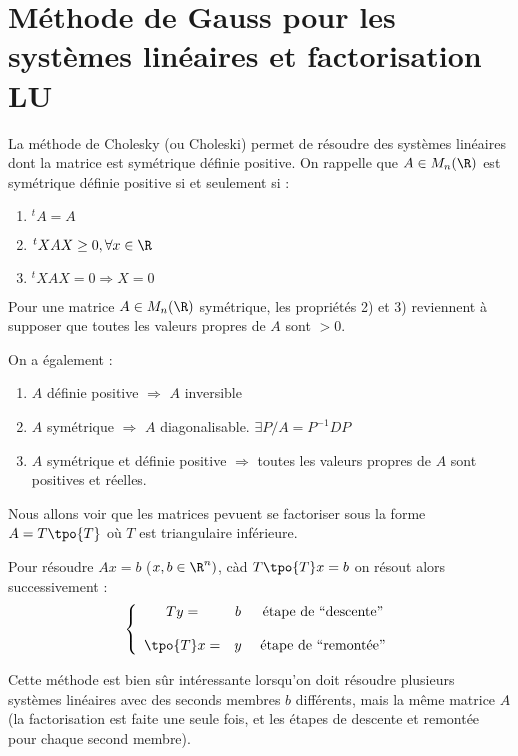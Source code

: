 \chapter{Méthode de Gauss pour les systèmes linéaires et factorisation LU}

La méthode de Cholesky (ou Choleski) permet de résoudre des systèmes linéaires
dont la matrice est symétrique définie positive. On rappelle que
$A \in M_n(\R)$ est symétrique définie positive si et seulement si :
\begin{enumerate}
    \item $^tA = A$
    \item $^tXAX \geq 0, \forall x \in \R$
    \item $^tXAX = 0 \Rightarrow X = 0$
\end{enumerate}
Pour une matrice $A \in M_n(\R)$ symétrique, les propriétés 2) et 3) reviennent à supposer que toutes les valeurs propres de $A$ sont $> 0$.

On a également :
\begin{enumerate}
    \item $A$ définie positive $\Rightarrow$ $A$ inversible
    \item $A$ symétrique $\Rightarrow$ $A$ diagonalisable. $\exists P / A = P^{-1}DP$
    \item $A$ symétrique et définie positive $\Rightarrow$ toutes les valeurs propres de $A$ sont positives et réelles.
\end{enumerate}

Nous allons voir que les matrices pevuent se factoriser sous la forme $A = T\tpo{T}$ où
$T$ est triangulaire inférieure.

Pour résoudre $Ax = b$ ($x,b \in \R^n)$, càd $T\tpo{T}x=b$ on résout alors successivement :
\begin{equation*}
\left\lbrace
    \begin{array}{ccc}
        Ty  = & b & \text{ étape de ``descente''}\\
        \\
        \tpo{T}x  = & y & \text{ étape de ``remontée''}
    \end{array}
\right.
\end{equation*}

Cette méthode est bien sûr intéressante lorsqu'on doit résoudre plusieurs systèmes linéaires
avec des seconds membres $b$ différents, mais la même matrice $A$ (la factorisation est faite
une seule fois, et les étapes de descente et remontée pour chaque second membre).


